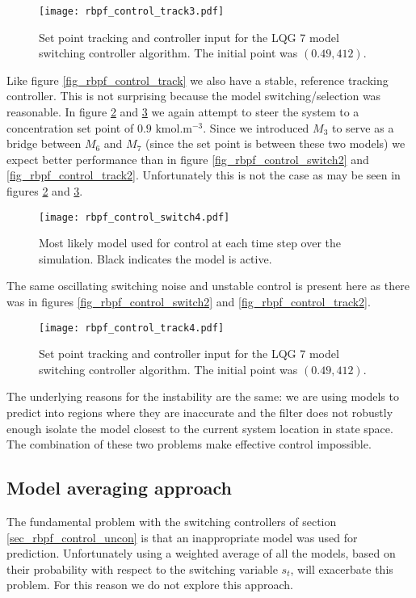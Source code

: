 \begin{figure}[H] 
\centering
\texttt{[image: rbpf\_control\_track3.pdf]}
\caption{Set point tracking and controller input for the LQG 7 model switching controller algorithm. The initial point was $(0.49, 412)$.}
\label{fig_rbpf_control_track3}
\end{figure}
Like figure \ref{fig_rbpf_control_track} we also have a stable, reference tracking controller. This is not surprising because the model switching/selection was reasonable. In figure \ref{fig_rbpf_control_switch4} and \ref{fig_rbpf_control_track4} we again attempt to steer the system to a concentration set point of $0.9$ kmol.m$^{-3}$. Since we introduced $M_3$ to serve as a bridge between $M_6$ and $M_7$ (since the set point is between these two models) we expect better performance than in figure \ref{fig_rbpf_control_switch2} and \ref{fig_rbpf_control_track2}. Unfortunately this is not the case as may be seen in figures \ref{fig_rbpf_control_switch4} and \ref{fig_rbpf_control_track4}.
\begin{figure}[H] 
\centering
\texttt{[image: rbpf\_control\_switch4.pdf]}
\caption{Most likely model used for control at each time step over the simulation. Black indicates the model is active.}
\label{fig_rbpf_control_switch4}
\end{figure}
The same oscillating switching noise and unstable control is present here as there was in figures \ref{fig_rbpf_control_switch2} and \ref{fig_rbpf_control_track2}.
\begin{figure}[H] 
\centering
\texttt{[image: rbpf\_control\_track4.pdf]}
\caption{Set point tracking and controller input for the LQG 7 model switching controller algorithm. The initial point was $(0.49, 412)$.}
\label{fig_rbpf_control_track4}
\end{figure}
The underlying reasons for the instability are the same: we are using models to predict into regions where they are inaccurate and the filter does not robustly enough isolate the model closest to the current system location in state space. The combination of these two problems make effective control impossible.

\subsection{Model averaging approach}
\label{sec_ma_rbpf}
The fundamental problem with the switching controllers of section \ref{sec_rbpf_control_uncon} is that an inappropriate model was used for prediction. Unfortunately using a weighted average of all the models, based on their probability with respect to the switching variable $s_t$, will exacerbate this problem. For this reason we do not explore this approach.

